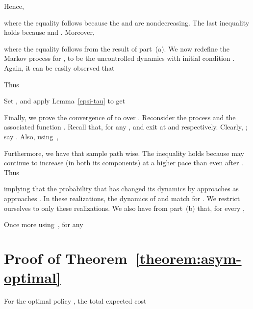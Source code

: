 \documentclass[10pt,journal,letterpaper]{IEEEtran}
\newcommand{\remove}[1]{}
\begin{document}
\begin{inparaenum}[(a)]
Hence,

where the equality follows because the  and  are
nondecreasing. The last inequality holds because  and .
Moreover,

where the equality follows from the result of part~(a). We
now redefine the Markov process  for , to be the
uncontrolled dynamics with initial condition . Again, it can be easily observed that

 Thus

Set , and apply Lemma~\ref{epsi-tau} to get


\remove{

Observe that

Thus,

The last equality can be easily seen to be true. Similarly, it can be shown that


aaaaaaaaaaaa


Following~\cite[Theorem~2.8]{stochproc.darling02fluid-limits} we have that, for every ,

Now we show that, for every ,

However,

Thus, it suffices to prove that

These follow once we recognize that


ssssssssssss

}
\item Finally, we prove the convergence of  to  over
. Reconsider the process
 and the associated function
. Recall that, for any ,  and
 exit  at 
and  respectively. Clearly,
; say
. Also,
using~\cite[Theorem~2.8]{stochproc.darling02fluid-limits},

Furthermore, we have that  sample path wise. The  inequality holds
because  may continue to increase (in both its components)
at a higher pace than  even after . Thus

implying that the probability that   has changed its
dynamics by  approaches  as  approaches
. In these realizations, the dynamics of  and 
match for . We restrict ourselves to
only these realizations. We also have from part~(b) that, for every
,

Once more using~\cite[Theorem~2.8]{stochproc.darling02fluid-limits}, for any 


\end{inparaenum}

\section{Proof of Theorem~\ref{theorem:asym-optimal}}
\label{proof-asym-optimal}
For the optimal policy , the total expected cost
\end{document}
